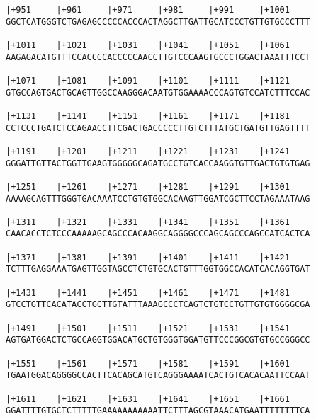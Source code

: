 \documentclass{article}
\begin{document}
\begin{Verbatim}
|+951     |+961     |+971     |+981     |+991     |+1001    
GGCTCATGGGTCTGAGAGCCCCCACCCACTAGGCTTGATTGCATCCCTGTTGTGCCCTTT
                                                            
|+1011    |+1021    |+1031    |+1041    |+1051    |+1061    
AAGAGACATGTTTCCACCCCACCCCCAACCTTGTCCCAAGTGCCCTGGACTAAATTTCCT
                                                            
|+1071    |+1081    |+1091    |+1101    |+1111    |+1121    
GTGCCAGTGACTGCAGTTGGCCAAGGGACAATGTGGAAAACCCAGTGTCCATCTTTCCAC
                                                            
|+1131    |+1141    |+1151    |+1161    |+1171    |+1181    
CCTCCCTGATCTCCAGAACCTTCGACTGACCCCCTTGTCTTTATGCTGATGTTGAGTTTT
                                                            
|+1191    |+1201    |+1211    |+1221    |+1231    |+1241    
GGGATTGTTACTGGTTGAAGTGGGGGCAGATGCCTGTCACCAAGGTGTTGACTGTGTGAG
                                                            
|+1251    |+1261    |+1271    |+1281    |+1291    |+1301    
AAAAGCAGTTTGGGTGACAAATCCTGTGTGGCACAAGTTGGATCGCTTCCTAGAAATAAG
                                                            
|+1311    |+1321    |+1331    |+1341    |+1351    |+1361    
CAACACCTCTCCCAAAAAGCAGCCCACAAGGCAGGGGCCCAGCAGCCCAGCCATCACTCA
                                                            
|+1371    |+1381    |+1391    |+1401    |+1411    |+1421    
TCTTTGAGGAAATGAGTTGGTAGCCTCTGTGCACTGTTTGGTGGCCACATCACAGGTGAT
                                                            
|+1431    |+1441    |+1451    |+1461    |+1471    |+1481    
GTCCTGTTCACATACCTGCTTGTATTTAAAGCCCTCAGTCTGTCCTGTTGTGTGGGGCGA
                                                            
|+1491    |+1501    |+1511    |+1521    |+1531    |+1541    
AGTGATGGACTCTGCCAGGTGGACATGCTGTGGGTGGATGTTCCCGGCGTGTGCCGGGCC
                                                            
|+1551    |+1561    |+1571    |+1581    |+1591    |+1601    
TGAATGGACAGGGGCCACTTCACAGCATGTCAGGGAAAATCACTGTCACACAATTCCAAT
                                                            
|+1611    |+1621    |+1631    |+1641    |+1651    |+1661    
GGATTTTGTGCTCTTTTTGAAAAAAAAAAATTCTTTAGCGTAAACATGAATTTTTTTTCA
                                                            

\end{Verbatim}
\end{document}
